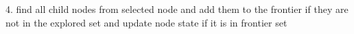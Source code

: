 \documentclass[preview]{standalone}
\begin{document}
\begin{center}
\begin{flushleft} 4. find all child nodes from selected node and add them to the frontier \newline if they are not in the explored set and update node state if it is in frontier set \newline \end{flushleft}
\end{center}
\end{document}
